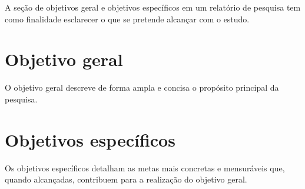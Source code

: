 A seção de objetivos geral e objetivos específicos em um relatório de pesquisa
tem como finalidade esclarecer o que se pretende alcançar com o estudo.

\section{Objetivo geral}

O objetivo geral descreve de forma ampla e concisa o propósito principal da
pesquisa.

\section{Objetivos específicos}

Os objetivos específicos detalham as metas mais concretas e mensuráveis que,
quando alcançadas, contribuem para a realização do objetivo geral.
